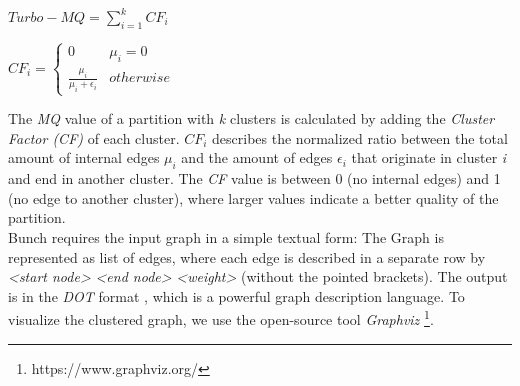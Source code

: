 \vspace{1cm}
\noindent
\begin{minipage}{.4\linewidth}
	
	\flushleft
	\begin{math}
	  Turbo-MQ = \sum_{i=1}^{k} CF_{i} 
	\end{math}
	

\end{minipage}%
\begin{minipage}{.5\linewidth}
	\flushleft
	\begin{math}
      CF_{i} = \begin{cases}
       0 & \mu_{i} = 0 \\
        \frac{\mu_{i}}{\mu_{i} + \epsilon_{i}}  & otherwise
      \end{cases}
  \end{math}


\end{minipage}
\vspace{1cm}

\noindent
The \textit{MQ} value of a partition with \textit{k} clusters is calculated by adding the \textit{Cluster Factor (CF)} of each cluster. $CF_{i}$ describes the normalized ratio between the total amount of internal edges $\mu_{i}$ and the amount of edges $\epsilon_{i}$ that originate in cluster \textit{i} and end in another cluster. The \textit{CF} value is between 0 (no internal edges) and 1 (no edge to another cluster), where larger values indicate a better quality of the partition. \\
Bunch requires the input graph in a simple textual form: The Graph is represented as list of edges, where each edge is described in a separate row by \textit{<start node>} \textit{<end node>} \textit{<weight>} (without the pointed brackets). The output is in the \textit{DOT} format \cite{DOT}, which is a powerful graph description language. To visualize the clustered graph, we use the open-source tool \textit{Graphviz} \footnote{https://www.graphviz.org/}.




